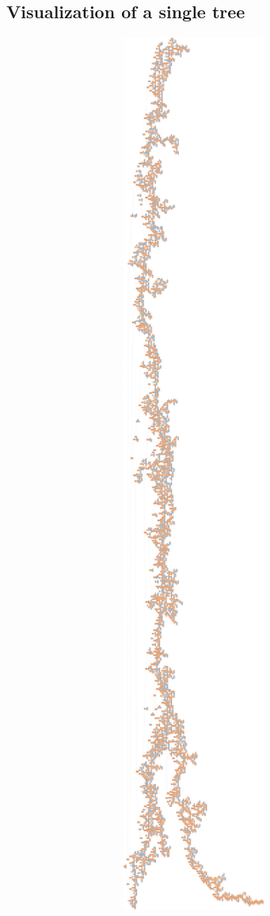 \documentclass[final]{article}
\begin{document}
\subsection{Visualization of a single tree}
\label{sec:treevis}
\includegraphics[width=0.94\textwidth,height=0.94\textheight]{Tree4.png}


\vspace{0.75in}
\end{document}
